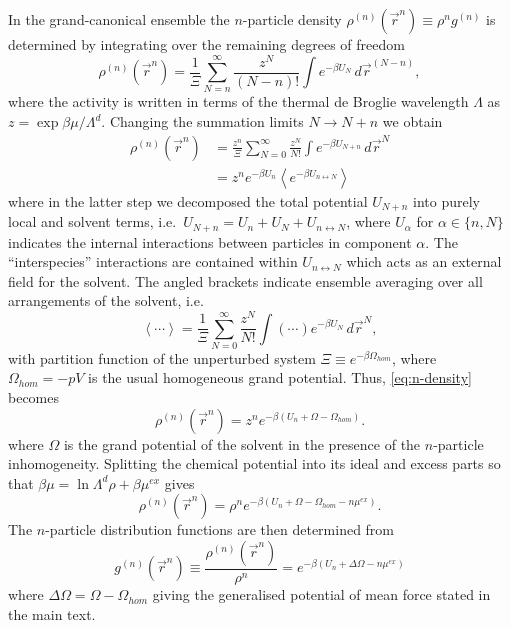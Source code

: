 \documentclass[11pt]{report}
\begin{document}
In the grand-canonical ensemble the $n$-particle density $\rho^{(n)}(\vec{r}^n) \equiv \rho^n g^{(n)}$ is determined by integrating over the remaining degrees of freedom~\cite{Hansen2013}
\begin{equation}
  \rho^{(n)}(\vec{r}^n)
  = \frac{1}{\Xi} \sum_{N=n}^\infty \frac{z^N}{(N-n)!} \int e^{-\beta U_N} \, d\vec{r}^{(N-n)},
\end{equation}
where the activity is written in terms of the thermal de Broglie wavelength $\Lambda$ as $z = \exp{\beta\mu} / \Lambda^d$.
Changing the summation limits $N \rightarrow N+n$ we obtain
\begin{equation}\label{eq:n-density}
\begin{aligned}
  \rho^{(n)}(\vec{r}^n)
  &= \frac{z^n}{\Xi} \sum_{N=0}^\infty \frac{z^N}{N!} \int e^{-\beta U_{N+n}} \, d\vec{r}^{N} \\
 & = z^n e^{-\beta U_n} \left< e^{-\beta U_{n \leftrightarrow N}} \right>
\end{aligned}
\end{equation}
where in the latter step we decomposed the total potential $U_{N+n}$ into purely local and solvent terms, i.e.\ $U_{N+n} = U_n + U_N + U_{n \leftrightarrow N}$, where $U_\alpha$ for $\alpha \in \{n,N\}$ indicates the internal interactions between particles in component $\alpha$.
The ``interspecies'' interactions are contained within $U_{n \leftrightarrow N}$ which acts as an external field for the solvent.
The angled brackets indicate ensemble averaging over all arrangements of the solvent, i.e.\
\begin{equation}
  \left< \cdots \right> =
  \frac{1}{\Xi} \sum_{N=0}^\infty \frac{z^N}{N!} \int \left(\cdots\right) e^{-\beta U_N} \, d\vec{r}^N,
\end{equation}
with partition function of the unperturbed system $\Xi \equiv e^{-\beta \Omega_{hom}}$, where $\Omega_{hom} = -p V$ is the usual homogeneous grand potential.
Thus, \eqref{eq:n-density} becomes
\begin{equation}
  \rho^{(n)}(\vec{r}^n)
  = z^n e^{-\beta (U_n + \Omega - \Omega_{hom})}.
\end{equation}
where $\Omega$ is the grand potential of the solvent in the presence of the $n$-particle inhomogeneity.
Splitting the chemical potential into its ideal and excess parts so that $\beta\mu = \ln{\Lambda^d \rho} + \beta\mu^{ex}$ gives
\begin{equation}
  \rho^{(n)}(\vec{r}^n)
  = \rho^n e^{-\beta (U_n + \Omega - \Omega_{hom} - n\mu^{ex})}.
\end{equation}
The $n$-particle distribution functions are then determined from~\cite{Hansen2013}
\begin{equation}\label{eq:distribution-functions}
  g^{(n)}(\vec{r}^n)
  \equiv \frac{\rho^{(n)}(\vec{r}^n)}{\rho^n}
  = e^{-\beta(U_n + \Delta\Omega - n\mu^{ex})}
\end{equation}
where $\Delta\Omega = \Omega - \Omega_{hom}$ giving the generalised potential of mean force stated in the main text.
\end{document}
